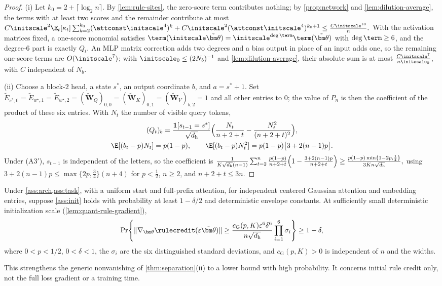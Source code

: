 \begin{proof}
(i) Let $k_0=2+\lceil\log_2n\rceil$. By \cref{lem:rule-sites}, the zero-score term contributes nothing; by \cref{prop:network} and
\cref{lem:dilution-average}, the terms with at least two scores and the remainder contribute at most
 $C\initscale^2\E_t[\kappa_t]\sum_{k=2}^{k_0}(\attconst\initscale^4)^k+C\initscale^2(\attconst\initscale^4)^{k_0+1}\le\frac{C\initscale^{10}}{n} .$ 
With the activation matrices fixed, a one-score monomial satisfies $\term(\initscale\tilde{\bm\theta})=\initscale^{\deg\term}\term(\tilde{\bm\theta})$ with $\deg\term\ge6$, and the
degree-$6$ part is exactly $Q_t$. An MLP matrix correction adds two degrees and a bias output in place of an input adds one, so the
remaining one-score terms are $O(\initscale^7)$; with $\initscale_0\le(2N_b)^{-1}$ and \cref{lem:dilution-average}, their absolute sum is at most
$\frac{C\initscale^7}{n\initscale_0}$, with $C$ independent of $N_b$.

(ii) Choose a block-$2$ head, a state $s^\ast$, an output coordinate $b$, and $a=s^\ast+1$. Set
$\tilde E_{s^\ast,0}=\tilde E_{w^\star,1}=\tilde E_{w^\star,2}=(\tilde{\mathbf W}_Q)_{0,0}=(\tilde{\mathbf W}_K)_{0,1}=(\tilde{\mathbf W}_V)_{b,2}=1$ and all other entries to $0$; the value of $P_n$ is then the
coefficient of the product of these six entries. With $N_t$ the number of visible query tokens,
\begin{gather*}
 (Q_t)_b=\frac{\mathbf 1[s_{t-1}=s^\ast]}{\sqrt{d_{\mathrm h}}}\Bigl(\frac{N_t}{n+2+t}-\frac{N_t^2}{(n+2+t)^2}\Bigr),\\
 \E[(b_t-p)N_t]=p(1-p),\qquad \E[(b_t-p)N_t^2]=p(1-p)\bigl[3+2(n-1)p\bigr].
\end{gather*}
Under (A3$'$), $s_{t-1}$ is independent of the letters, so the coefficient is
 $\frac{1}{K\sqrt{d_{\mathrm h}}(n-1)}\sum_{t=2}^n\frac{p(1-p)}{n+2+t}\Bigl(1-\frac{3+2(n-1)p}{n+2+t}\Bigr) \ge\frac{p(1-p)\min\{1-2p,\frac{1}{4}\}}{3Kn\sqrt{d_{\mathrm h}}},$ 
using $3+2(n-1)p\le\max\{2p,\frac{3}{4}\}(n+4)$ for $p<\frac{1}{2}$, $n\ge2$, and $n+2+t\le3n$.
\end{proof}

\begin{proposition}
\label{prop:gaussian-credit}
Under \cref{ass:arch,ass:task}, with a uniform start
and full-prefix attention, for independent centered Gaussian
attention and embedding entries, suppose \cref{ass:init} holds with probability
at least $1-\delta/2$ and deterministic envelope constants. At sufficiently
small deterministic initialization scale (\cref{lem:quant-rule-gradient}),
\[
 \Pr\!\left\{\|\nabla_{\bm\theta}\rulecredit(\varepsilon\tilde{\bm\theta})\|
 \ge\frac{c_{\mathrm G}(p,K)\varepsilon^6\delta^6}{n\sqrt{d_{\mathrm h}}}
 \prod_{i=1}^6\sigma_i\right\}\ge1-\delta,
\]
where $0<p<1/2$, $0<\delta<1$, the $\sigma_i$ are the six distinguished
standard deviations, and $c_{\mathrm G}(p,K)>0$ is independent of $n$ and the widths.
\end{proposition}
This strengthens the generic nonvanishing of \cref{thm:separation}(ii) to a lower bound with high probability.
It concerns initial rule credit only, not the full loss gradient or a training time.

